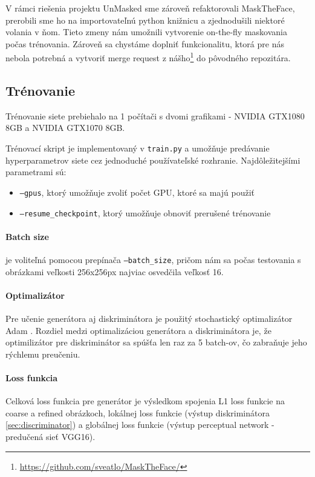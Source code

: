 \documentclass [11pt, a4paper]{article}
\begin{document}
				V rámci riešenia projektu UnMasked sme zároveň refaktorovali MaskTheFace, prerobili sme ho na importovateľnú python knižnicu a zjednodušili niektoré volania v ňom. Tieto zmeny nám umožnili vytvorenie on-the-fly maskovania počas trénovania. Zároveň sa chystáme doplniť funkcionalitu, ktorá pre nás nebola potrebná a vytvoriť merge request z nášho\footnote{\url{https://github.com/sveatlo/MaskTheFace/}} do pôvodného repozitára.
			
		\subsection{Trénovanie}
			Trénovanie siete prebiehalo na 1 počítači s dvomi grafikami - NVIDIA GTX1080 8GB a NVIDIA GTX1070 8GB.
			
			Trénovací skript je implementovaný v \texttt{train.py} a umožňuje predávanie hyperparametrov siete cez jednoduché používateľské rozhranie. Najdôležitejšími parametrami sú:
			\begin{itemize}
				\item \texttt{--gpus}, ktorý umožňuje zvoliť počet GPU, ktoré sa majú použiť
				\item \texttt{--resume\_checkpoint}, ktorý umožňuje obnoviť prerušené trénovanie
			\end{itemize}
		
			\paragraph{Batch size} je voliteľná pomocou prepínača \texttt{--batch\_size}, pričom nám sa počas testovania s obrázkami veľkosti 256x256px najviac osvedčila veľkosť 16.
			\paragraph{Optimalizátor} Pre učenie generátora aj diskriminátora je použitý stochastický optimalizátor Adam \cite{kingma2017adam}. Rozdiel medzi optimalizáciou generátora a diskriminátora je, že optimilizátor pre diskriminátor sa spúšťa len raz za 5 batch-ov, čo zabraňuje jeho rýchlemu preučeniu.
			\paragraph{Loss funkcia} Celková loss funkcia pre generátor je výsledkom spojenia L1 loss funkcie na coarse a refined obrázkoch, lokálnej loss funkcie (výstup diskriminátora \ref{sec:discriminator}) a globálnej loss funkcie (výstup perceptual network - predučená sieť VGG16).
\end{document}
